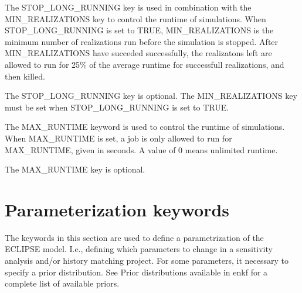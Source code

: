 \documentclass[letterpaper,10pt,english]{sphinxmanual}
\begin{document}
\begin{sphinxShadowBox}

The STOP\_LONG\_RUNNING key is used in combination with the MIN\_REALIZATIONS key
to control the runtime of simulations. When STOP\_LONG\_RUNNING is set to TRUE,
MIN\_REALIZATIONS is the minimum number of realizations run before the
simulation is stopped. After MIN\_REALIZATIONS have succeded successfully, the
realizatons left are allowed to run for 25\% of the average runtime for
successfull realizations, and then killed.


%
\begin{sphinxVerbatim}[commandchars=\\\{\}]
         
  
 
\end{sphinxVerbatim}

The STOP\_LONG\_RUNNING key is optional. The MIN\_REALIZATIONS key must be set
when STOP\_LONG\_RUNNING is set to TRUE.
\end{sphinxShadowBox}
\label{\detokenize{keywords/index:max-runtime}}
\begin{sphinxShadowBox}

The MAX\_RUNTIME keyword is used to control the runtime of simulations. When
MAX\_RUNTIME is set, a job is only allowed to run for MAX\_RUNTIME, given in
seconds. A value of 0 means unlimited runtime.


%
\begin{sphinxVerbatim}[commandchars=\\\{\}]
       
 
\end{sphinxVerbatim}

The MAX\_RUNTIME key is optional.
\end{sphinxShadowBox}


\section{Parameterization keywords}
\label{\detokenize{keywords/index:parameterization-keywords}}\label{\detokenize{keywords/index:id4}}
The keywords in this section are used to define a parametrization of the ECLIPSE
model. I.e., defining which parameters to change in a sensitivity analysis
and/or history matching project. For some parameters, it necessary to specify a
prior distribution. See Prior distributions available in enkf for a complete
list of available priors.
\end{document}
